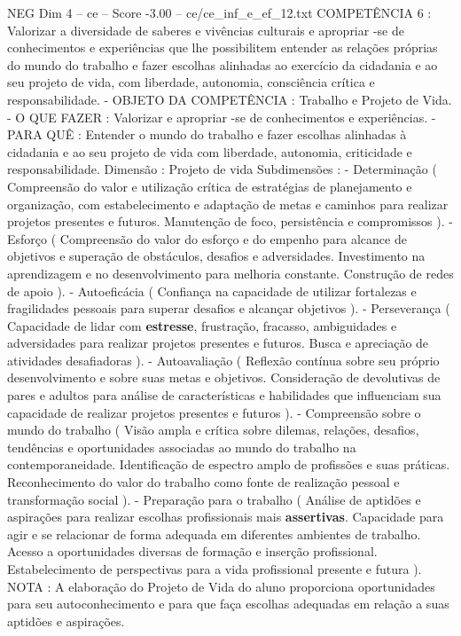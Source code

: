\begin{textsample}{NEG Dim 4 – ce – Score -3.00 – ce/ce\_inf\_e\_ef\_12.txt}
COMPETÊNCIA 6 : Valorizar a diversidade de saberes e vivências culturais e apropriar -se de conhecimentos e experiências que lhe possibilitem entender as relações próprias do mundo do trabalho e fazer escolhas alinhadas ao exercício da cidadania e ao seu projeto de vida, com liberdade, autonomia, consciência crítica e responsabilidade. - OBJETO DA COMPETÊNCIA : Trabalho e Projeto de Vida. - O QUE FAZER : Valorizar e apropriar -se de conhecimentos e experiências. - PARA QUÊ : Entender o mundo do trabalho e fazer escolhas alinhadas à cidadania e ao seu projeto de vida com liberdade, autonomia, criticidade e responsabilidade.
Dimensão : Projeto de vida Subdimensões : - Determinação ( Compreensão do valor e utilização crítica de estratégias de planejamento e organização, com estabelecimento e adaptação de metas e caminhos para realizar projetos presentes e futuros.
Manutenção de foco, persistência e compromissos ). - Esforço ( Compreensão do valor do esforço e do empenho para alcance de objetivos e superação de obstáculos, desafios e adversidades.
Investimento na aprendizagem e no desenvolvimento para melhoria constante.
Construção de redes de apoio ). - Autoeficácia ( Confiança na capacidade de utilizar fortalezas e fragilidades pessoais para superar desafios e alcançar objetivos ). - Perseverança ( Capacidade de lidar com \textbf{estresse}, frustração, fracasso, ambiguidades e adversidades para realizar projetos presentes e futuros.
Busca e apreciação de atividades desafiadoras ). - Autoavaliação ( Reflexão contínua sobre seu próprio desenvolvimento e sobre suas metas e objetivos.
Consideração de devolutivas de pares e adultos para análise de características e habilidades que influenciam sua capacidade de realizar projetos presentes e futuros ). - Compreensão sobre o mundo do trabalho ( Visão ampla e crítica sobre dilemas, relações, desafios, tendências e oportunidades associadas ao mundo do trabalho na contemporaneidade.
Identificação de espectro amplo de profissões e suas práticas.
Reconhecimento do valor do trabalho como fonte de realização pessoal e transformação social ). - Preparação para o trabalho ( Análise de aptidões e aspirações para realizar escolhas profissionais mais \textbf{assertivas}.
Capacidade para agir e se relacionar de forma adequada em diferentes ambientes de trabalho.
Acesso a oportunidades diversas de formação e inserção profissional.
Estabelecimento de perspectivas para a vida profissional presente e futura ).
NOTA : A elaboração do Projeto de Vida do aluno proporciona oportunidades para seu autoconhecimento e para que faça escolhas adequadas em relação a suas aptidões e aspirações.

\end{textsample}
